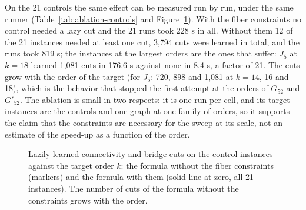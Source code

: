 \documentclass[11pt]{article}
\theoremstyle{definition}
\theoremstyle{remark}
\newcommand{\Ga}{G_{52}}
\newcommand{\Gb}{G'_{52}}
\begin{document}
On the 21 controls the same effect can be measured run by run, under the same runner (Table~\ref{tab:ablation-controls} and Figure~\ref{fig:ablation}). With the fiber constraints no control needed a lazy cut and the 21 runs took 228 s in all. Without them 12 of the 21 instances needed at least one cut, 3{,}794 cuts were learned in total, and the runs took 819 s; the instances at the largest orders are the ones that
suffer: $J_5$ at $k = 18$ learned 1{,}081 cuts in 176.6 s against none in 8.4 s, a factor of 21. The cuts grow with the order of the target (for $J_5$: 720, 898 and 1{,}081 at $k = 14$, 16 and 18), which is the behavior that stopped the first attempt at the orders of $\Ga$ and $\Gb$. The ablation is small in two respects: it is one run per cell, and its target instances are the controls and one graph at one family of orders,
so it supports the claim that the constraints are necessary for the sweep at its scale, not an estimate of the speed-up as a function of the order.

\begin{figure}[tbp]\centering
{}
\caption{Lazily learned connectivity and bridge cuts on the control instances against the target order $k$: the formula without the fiber constraints (markers) and the formula with them (solid line at zero, all 21 instances). The number of cuts of the formula without the constraints grows with the order.}\label{fig:ablation}
\end{figure}
\end{document}
